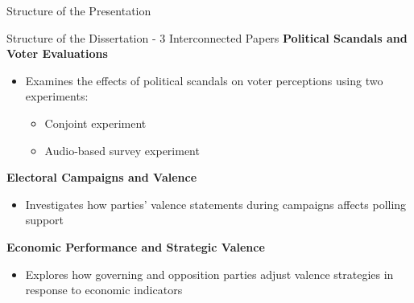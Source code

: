 \documentclass[9pt, aspectratio=169]{beamer}
\begin{document}
\begin{section}{Structure of the Presentation}
\begin{frame}{Structure of the Dissertation - 3 Interconnected Papers}
    \textbf{Political Scandals and Voter Evaluations}  \vspace{0.2cm}
    \begin{itemize}
        \item Examines the effects of political scandals on voter perceptions using two experiments: \vspace{0.1cm}
        \begin{itemize}
            \item Conjoint experiment\vspace{0.1cm}
            \item Audio-based survey experiment
        \end{itemize}
    \end{itemize}
\vspace{0.3cm}
    \textbf{Electoral Campaigns and Valence}  \vspace{0.2cm}
    \begin{itemize}
        \item Investigates how parties’ valence statements during campaigns affects polling support
    \end{itemize}
    \vspace{0.3cm}
    
    \textbf{Economic Performance and Strategic Valence}  \vspace{0.2cm}
    \begin{itemize}
        \item Explores how governing and opposition parties adjust valence strategies in response to economic indicators
    \end{itemize}
\end{frame}
\end{section}
\end{document}
